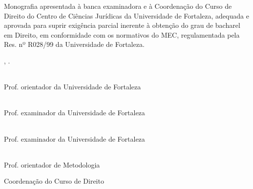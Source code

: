 \begin{folhadeaprovacao}

    \begin{center}
      \MakeUppercase{\large\imprimirautor}

      \vspace{1.5cm}
      \textbf{\MakeUppercase{\Large\imprimirtitulo}}
   \end{center}

   \vfill

   \hspace{.5\textwidth}
   \begin{minipage}{.4\textwidth}
    Monografia apresentada à banca examinadora e à Coordenação do Curso de
    Direito do Centro de Ciências Jurídicas da Universidade de Fortaleza, 
    adequada e aprovada para suprir exigência parcial inerente à obtenção
    do grau de bacharel em Direito, em conformidade com os normativos do MEC,
    regulamentada pela Res. nº R028/99 da Universidade de Fortaleza.
    \end{minipage}

    \vspace{1.5cm}

    {\imprimirlocal}, {\imprimirdata}.

    \vspace{1cm}

    \begin{minipage}{10cm}
     \imprimirorientador \\
     Prof. orientador da Universidade de Fortaleza

     \vspace{.5cm}

     \nomeprofessorA \\
     Prof. examinador da Universidade de Fortaleza

     \vspace{.5cm}

     \nomeprofessorB \\
     Prof. examinador da Universidade de Fortaleza

     \vspace{.5cm}

     \imprimircoorientador \\
     Prof. orientador de Metodologia

     \vspace{.5cm}

     Coordenação do Curso de Direito

    \end{minipage}

  \vfill
  
\end{folhadeaprovacao}